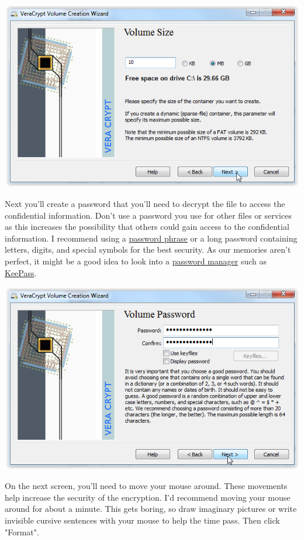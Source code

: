 \documentclass[12pt]{article}
\begin{document}
\includegraphics{imgs/VC05.PNG}

Next you'll create a password that you'll need to decrypt the file to access the confidential
information. Don't use a password you use for other files or services as this increases the
possibility that others could gain access to the confidential information. I recommend using
a \href{http://www.howtogeek.com/howto/windows/using-password-phrases-for-better-security/}
{password phrase} or a long password containing letters, digits, and special symbols for the
best security. As our memories aren't perfect, it might be a good idea to look into a
\href{http://lifehacker.com/5042616/five-best-password-managers}{password manager} such as
\href{http://keepass.info/}{KeePass}.

\includegraphics{imgs/VC06.PNG}

On the next screen, you'll need to move your mouse around. These movements help increase the
security of the encryption. I'd recommend moving your mouse around for about a minute. This
gets boring, so draw imaginary pictures or write invisible cursive sentences with your mouse
to help the time pass. Then click "Format".
\end{document}
